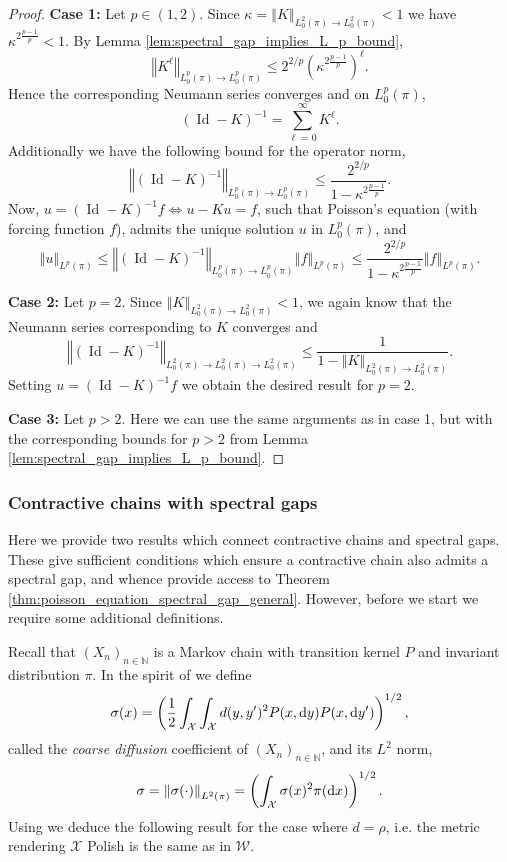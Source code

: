 \documentclass[12pt]{article}
\theoremstyle{plain}
\renewcommand{\d}{{\rm d}}
\newcommand{\norm}[1]{\left\Vert #1 \right\Vert}
\newcommand{\N}{\mathbb{N}}
\newcommand{\cX}{\mathcal{X}}
\DeclareMathOperator{\Id}{\text{Id}}
\begin{document}
{\begin{proof}
\textbf{Case 1:} Let $p \in (1,2)$. Since $\kappa = \norm{K}_{L^2_0(\pi) \to L^2_0(\pi)} <1$ we have $\kappa^{2\frac{p-1}{p}} <1$. 
By Lemma \ref{lem:spectral_gap_implies_L_p_bound},  
\[
\norm{K^\ell}_{L^p_0(\pi) \to L^p_0(\pi)} \leq 2^{2/p} \left(\kappa^{2\frac{p-1}{p}} \right)^\ell.
\]
Hence the corresponding Neumann series converges and on $L^p_0(\pi)$,  
\[
(\Id - K)^{-1} = \sum_{\ell=0}^\infty K^\ell.
\]
Additionally we have the following bound for the operator norm, 
\[
\norm{(\Id - K)^{-1}}_{L^p_0(\pi) \to L^p_0(\pi)} \leq \frac{2^{2/p}}{1- \kappa^{2\frac{p-1}{p}}}.
\]
Now, $ u = (\Id - K)^{-1} f \Leftrightarrow u - Ku =f$, such that Poisson's equation (with forcing function $f$), admits the unique solution $u$ in $L^p_0(\pi)$, and 
\[
\norm{u}_{L^p(\pi)} \leq \norm{(\Id - K)^{-1}}_{L^p_0(\pi) \to L^p_0(\pi)} \norm{f}_{L^p(\pi)} \leq \frac{2^{2/p}}{1- \kappa^{2\frac{p-1}{p}}} \norm{f}_{L^p(\pi)}.
\] 

\textbf{Case 2:} Let $p=2$. Since $\norm{K}_{L^2_0(\pi) \to L^2_0(\pi)} <1$, we again know that the Neumann series corresponding to $K$ converges and 
\[
\norm{(\Id - K)^{-1}}_{L^2_0(\pi) \to L^2_0(\pi) \to L^2_0(\pi)} \leq \frac{1}{1 - \norm{K}_{L^2_0(\pi) \to L^2_0(\pi)} }. 
\]
Setting $u = (\Id - K)^{-1}f$ we obtain the desired result for $p=2$.

\textbf{Case 3:} Let $p >2$. Here we can use the same arguments as in case 1, but with the corresponding bounds for $p >2$ from Lemma \ref{lem:spectral_gap_implies_L_p_bound}. 
\end{proof}


\subsubsection{Contractive chains with spectral gaps}\label{subsec:sufficient_conditions_spectral_gap}
Here we provide two results which connect contractive chains and spectral gaps. 
These give sufficient conditions which ensure a contractive chain also admits a spectral gap, and whence provide access to Theorem \ref{thm:poisson_equation_spectral_gap_general}. 
However, before we start we require some additional definitions. 

Recall that $(X_n)_{n \in \N}$ is a Markov chain with transition kernel $P$ and invariant distribution $\pi$. 
In the spirit of \cite{ollivier2009ricci} we define
\[
\sigma(x) = \left(\frac{1}{2} \int_\cX \int_\cX d(y,y')^2 P(x, \d y) P(x, \d y') \right)^{1/2},
\]
called the \textit{coarse diffusion} coefficient of $(X_n)_{n \in \N}$, and its $L^2$ norm,
\[
\sigma = \norm{\sigma(\cdot)}_{L^2(\pi)} = \left( \int_\cX \sigma (x)^2 \pi(\d x) \right)^{1/2} . 
\]
Using \cite[Proposition 30]{ollivier2009ricci} we deduce the following result for the case where $d = \rho$, i.e. the metric rendering $\cX$ Polish is the same as in $\mathcal{W}$. 

}
\end{document}

